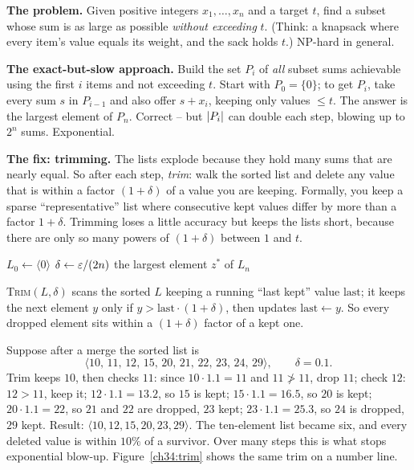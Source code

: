 \textbf{The problem.} Given positive integers $x_1,\dots,x_n$ and a target
$t$, find a subset whose sum is as large as possible \emph{without exceeding}
$t$. (Think: a knapsack where every item's value equals its weight, and the
sack holds $t$.) NP-hard in general.

\textbf{The exact-but-slow approach.} Build the set $P_i$ of \emph{all} subset
sums achievable using the first $i$ items and not exceeding $t$. Start with
$P_0=\{0\}$; to get $P_i$, take every sum $s$ in $P_{i-1}$ and also offer
$s+x_i$, keeping only values $\le t$. The answer is the largest element of
$P_n$. Correct -- but $\lvert P_i\rvert$ can double each step, blowing up to $2^n$
sums. Exponential.

\textbf{The fix: trimming.} The lists explode because they hold many sums that
are nearly equal. So after each step, \emph{trim}: walk the sorted list and
delete any value that is within a factor $(1+\delta)$ of a value you are
keeping. Formally, you keep a sparse ``representative'' list where consecutive
kept values differ by more than a factor $1+\delta$. Trimming loses a little
accuracy but keeps the lists short, because there are only so many powers of
$(1+\delta)$ between $1$ and $t$.

\begin{algorithm}[H]
\caption{\textsc{Approx-Subset-Sum}$(x_1,\dots,x_n,\,t,\,\eps)$}
$L_0 \gets \langle 0 \rangle$\;
$\delta \gets \varepsilon/(2n)$\;
\Return the largest element $z^{*}$ of $L_n$\;
\end{algorithm}

\textsc{Trim}$(L,\delta)$ scans the sorted $L$ keeping a running ``last kept''
value $\mathrm{last}$; it keeps the next element $y$ only if
$y > \mathrm{last}\cdot(1+\delta)$, then updates $\mathrm{last}\gets y$. So
every dropped element sits within a $(1+\delta)$ factor of a kept one.

\begin{example}
\label{ch34:ss-trim}
Suppose after a merge the sorted list is
\[
\langle 10,\,11,\,12,\,15,\,20,\,21,\,22,\,23,\,24,\,29\rangle,
\qquad \delta = 0.1 .
\]
Trim keeps $10$, then checks $11$: since
$10\cdot1.1=11$ and $11 \not> 11$, drop $11$; check $12$: $12 > 11$, keep it;
$12\cdot1.1=13.2$, so $15$ is kept; $15\cdot1.1=16.5$, so $20$ is kept;
$20\cdot1.1=22$, so $21$ and $22$ are dropped, $23$ kept;
$23\cdot1.1=25.3$, so $24$ is dropped, $29$ kept. Result:
$\langle 10,12,15,20,23,29\rangle$. The ten-element list became six, and every
deleted value is within $10\%$ of a survivor. Over many steps this is what
stops exponential blow-up. Figure~\ref{ch34:trim} shows the same trim on a
number line.
\end{example}

